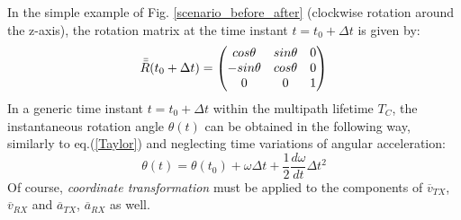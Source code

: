In the simple example of Fig. \ref{scenario_before_after} (clockwise rotation around the z-axis), the rotation matrix at the time instant $t=t_0+\Delta t$ is given by:
\begin{equation*}
\Bar{\Bar{R}}(t_0+\Delta t)=
\begin{pmatrix}
cos\theta & sin\theta & 0\\
-sin\theta & cos\theta & 0\\
0 & 0 & 1
\end{pmatrix}
\end{equation*}
In a generic time instant $t=t_0+\Delta t$ within the multipath lifetime $T_C$, the instantaneous rotation angle $\theta(t)$ can be obtained in the following way, similarly to eq.(\ref{Taylor}) and neglecting time variations of angular acceleration:
\begin{equation*}
\theta(t)=\theta(t_0)+\omega\Delta t+\frac{1}{2}\frac{d\omega}{dt}\Delta t^2
\end{equation*}
Of course, \textit{coordinate transformation} must be applied to the components of $\overline{v}_{TX}$, $\overline{v}_{RX}$ and $\overline{a}_{TX}$, $\overline{a}_{RX}$ as well.


